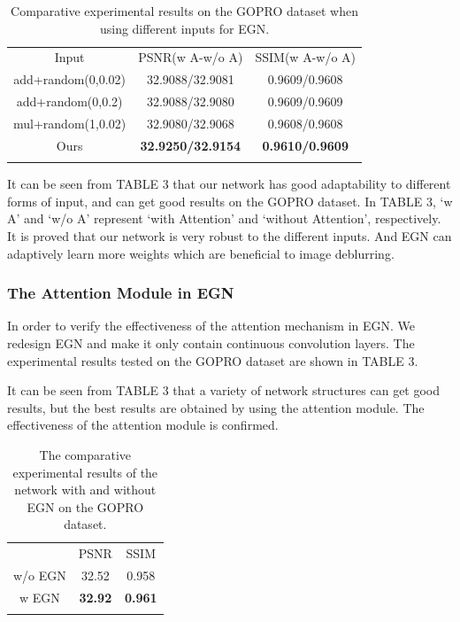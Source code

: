 \begin{sloppypar}
\begin{table}[!t]
\renewcommand{\arraystretch}{1.3}
\caption{Comparative experimental results on the GOPRO dataset when using different inputs for EGN.}
\label{table3}
\centering
\begin{tabular}{ccc}
\hline\noalign{\smallskip}
Input & PSNR(w A-w/o A) & SSIM(w A-w/o A)  \\
\noalign{\smallskip}\hline\noalign{\smallskip}
add+random(0,0.02) & 32.9088/32.9081 & 0.9609/0.9608 \\
add+random(0,0.2) & 32.9088/32.9080 & 0.9609/0.9609 \\
mul+random(1,0.02) & 32.9080/32.9068 & 0.9608/0.9608 \\
Ours & \bf{32.9250/32.9154} & \bf{0.9610/0.9609} \\
\noalign{\smallskip}\hline
\end{tabular}
\end{table}

It can be seen from TABLE 3 that our network has good adaptability to different forms of input, and can get good results on the GOPRO dataset. In TABLE 3, ‘w A’ and ‘w/o A’ represent ‘with Attention’ and ‘without Attention’, respectively. It is proved that our network is very robust to the different inputs. And EGN can adaptively learn more weights which are beneficial to image deblurring.

\subsubsection{The Attention Module in EGN}
In order to verify the effectiveness of the attention mechanism in EGN. We redesign EGN and make it only contain continuous convolution layers. The experimental results tested on the GOPRO dataset are shown in TABLE 3.

It can be seen from TABLE 3 that a variety of network structures can get good results, but the best results are obtained by using the attention module. The effectiveness of the attention module is confirmed.

\begin{table}[!t]
\renewcommand{\arraystretch}{1.3}
\caption{The comparative experimental results of the network with and without EGN on the GOPRO dataset.}
\label{table4}
\centering
\begin{tabular}{ccc}
\hline\noalign{\smallskip}
 & PSNR & SSIM \\
\noalign{\smallskip}\hline\noalign{\smallskip}
w/o EGN & 32.52 & 0.958 \\
w EGN & \bf{32.92} & \bf{0.961} \\
\noalign{\smallskip}\hline
\end{tabular}
\end{table}


\end{sloppypar}
